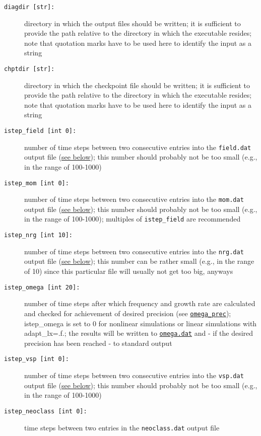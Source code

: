 \documentclass[12pt]{article}
\begin{document}
\begin{description}

\item[\texttt{diagdir [str]:}] directory in which the output files should be written; it is sufficient
to provide the path relative to the directory in which the executable resides; note that quotation marks
have to be used here to identify the input as a string
\item[\texttt{chptdir [str]:}] directory in which the checkpoint file should be written; it is sufficient
to provide the path relative to the directory in which the executable resides; note that quotation marks
have to be used here to identify the input as a string
\item[\hypertarget{istep_field}{\tt istep\_field [int 0]:}] number of time steps between two consecutive
entries into the \texttt{field.dat} output file (\hyperref[subsec:field-file]{see below});
this number should probably not be too small (e.g., in the range of 100-1000)
\item[\hypertarget{istep_mom}{\tt istep\_mom [int 0]:}] number of time steps between two consecutive
entries into the \texttt{mom.dat} output file (\hyperref[subsec:mom-file]{see below});
this number should probably not be too small (e.g., in the
range of 100-1000); multiples of \texttt{istep\_field} are recommended
\item[\hypertarget{istep_nrg}{\tt istep\_nrg [int 10]:}] number of time steps between two consecutive
entries into the \texttt{nrg.dat} output file (\hyperref[subsec:nrg-file]{see below});
this number can be rather small (e.g., in the range of 10) since this particular file will usually
not get too big, anyways
\item[\hypertarget{istep_omega}{\tt istep\_omega [int 20]:}] number of time
steps after which frequency and growth rate are calculated and checked for achievement of desired precision
(see \hyperlink{omega_prec}{\tt omega\_prec}); istep\_omega is set to 0 for nonlinear simulations or linear simulations with
adapt\_lx=.f.; the results will be written to \hyperref[subsec:omega-file]{\tt omega.dat} and - if
the desired precision has been reached - to standard output
\item[\hypertarget{istep_vsp}{\tt istep\_vsp [int 0]:}] number of time steps between two consecutive
entries into the \texttt{vsp.dat} output file (\hyperref[subsec:vsp-file]{see below});
this number should probably not be too small (e.g., in the range of 100-1000)
\item[\hypertarget{istep_neoclass}{\tt istep\_neoclass [int 0]:}] time steps between two entries in the \texttt{neoclass.dat} output file

\end{description}
\end{document}
